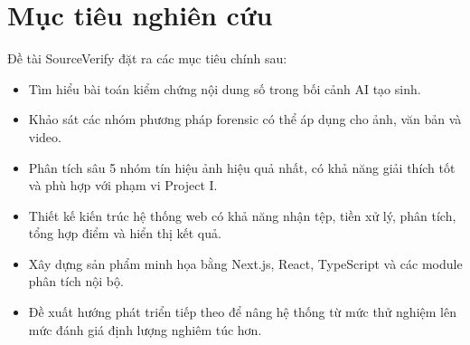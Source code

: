 \section{Mục tiêu nghiên cứu}
Đề tài SourceVerify đặt ra các mục tiêu chính sau:
\begin{itemize}
  \item Tìm hiểu bài toán kiểm chứng nội dung số trong bối cảnh AI tạo sinh.
  \item Khảo sát các nhóm phương pháp forensic có thể áp dụng cho ảnh, văn bản và video.
  \item Phân tích sâu 5 nhóm tín hiệu ảnh hiệu quả nhất, có khả năng giải thích tốt và phù hợp với phạm vi Project I.
  \item Thiết kế kiến trúc hệ thống web có khả năng nhận tệp, tiền xử lý, phân tích, tổng hợp điểm và hiển thị kết quả.
  \item Xây dựng sản phẩm minh họa bằng Next.js, React, TypeScript và các module phân tích nội bộ.
  \item Đề xuất hướng phát triển tiếp theo để nâng hệ thống từ mức thử nghiệm lên mức đánh giá định lượng nghiêm túc hơn.
\end{itemize}
